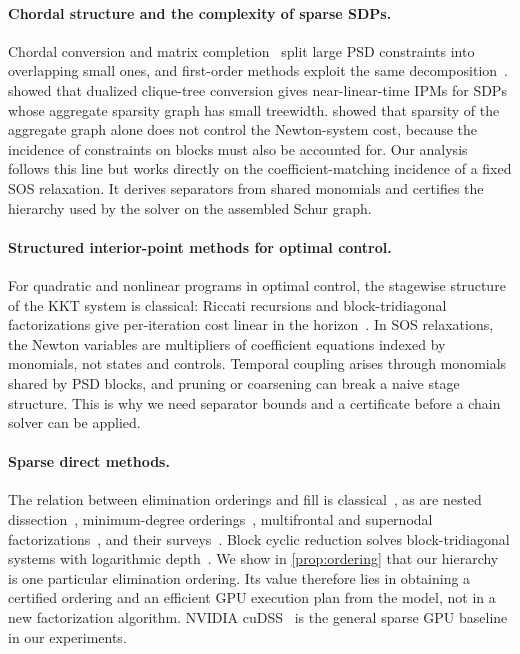 \paragraph{Chordal structure and the complexity of sparse SDPs.}
Chordal conversion and matrix completion~\cite{fukuda2001exploiting,nakata2003exploiting,kim2011exploiting,vandenberghe2015chordal}
split large PSD constraints into overlapping small ones, and
first-order methods exploit the same decomposition~\cite{zheng2020chordal}.
\citet{zhang2020clique} showed that dualized clique-tree conversion gives
near-linear-time IPMs for SDPs whose aggregate sparsity graph has small
treewidth. \citet{zhang2024chordal} showed that sparsity of the aggregate graph
alone does not control the Newton-system cost, because the incidence of
constraints on blocks must also be accounted for. Our analysis follows this line
but works directly on the coefficient-matching incidence of a fixed SOS
relaxation. It derives separators from shared monomials and certifies the
hierarchy used by the solver on the assembled Schur graph.

\paragraph{Structured interior-point methods for optimal control.}
For quadratic and nonlinear programs in optimal control, the stagewise structure
of the KKT system is classical: Riccati recursions and block-tridiagonal
factorizations give per-iteration cost linear in the
horizon~\cite{wright1991partitioned,rao1998application,frison2020hpipm}.
In SOS relaxations, the Newton variables are multipliers of coefficient
equations indexed by monomials, not states and controls. Temporal coupling
arises through monomials shared by PSD blocks, and pruning or coarsening can
break a naive stage structure. This is why we need separator bounds and a
certificate before a chain solver can be applied.

\paragraph{Sparse direct methods.}
The relation between elimination orderings and fill is
classical~\cite{rose1976algorithmic,liu1990role}, as are nested
dissection~\cite{george1973nested}, minimum-degree
orderings~\cite{amestoy1996approximate}, multifrontal and supernodal
factorizations~\cite{duff1983multifrontal,chen2008cholmod}, and their
surveys~\cite{davis2016survey}. Block cyclic reduction solves block-tridiagonal
systems with logarithmic depth~\cite{hockney1965fast,heller1976some}. We show
in \cref{prop:ordering} that our hierarchy is one particular elimination
ordering. Its value therefore lies in obtaining a certified ordering and an
efficient GPU execution plan from the model, not in a new factorization
algorithm. NVIDIA cuDSS~\cite{cudss} is the general sparse GPU baseline in our
experiments.

